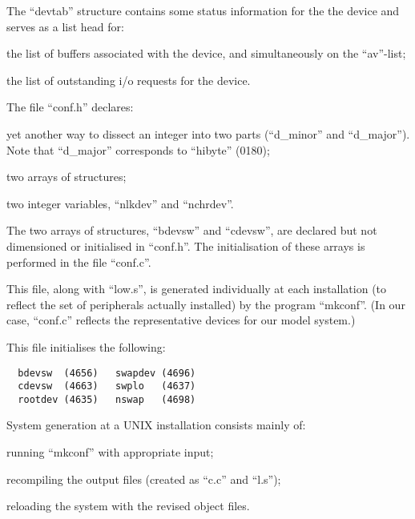 The ``devtab'' structure contains some
status information for the the device
and serves as a list head for:

\bd
\item[(a)] the list of buffers associated
 with the device, and simultaneously on the ``av''-list;

\item[(b)] the list of outstanding i/o
 requests for the device.
\ed


The file ``conf.h'' declares:

\bi
\item yet another way to dissect an
integer into two parts (``d\_minor''
and ``d\_major''). Note that
``d\_major'' corresponds to ``hibyte'' (0180);

\item two arrays of structures;

\item two integer variables, ``nlkdev''
and ``nchrdev''.
\ei

The two arrays of structures, ``bdevsw''
and ``cdevsw'', are declared but not
dimensioned or initialised in ``conf.h''.
The initialisation of these arrays is
performed in the file ``conf.c''.


This file, along with ``low.s'', is generated individually at each installation (to reflect the set of peripherals
actually installed) by the program
``mkconf''. (In our case, ``conf.c''
reflects the representative devices for
our model system.)

This file initialises the following:

\begin{verbatim}
  bdevsw  (4656)   swapdev (4696)
  cdevsw  (4663)   swplo   (4637)
  rootdev (4635)   nswap   (4698)
\end{verbatim}


System generation at a UNIX installation consists mainly of:

\bi
\item running ``mkconf'' with appropriate
 input;

\item recompiling the output files (created
as ``c.c'' and ``l.s'');

\item reloading the system with the revised
 object files.
\ei

